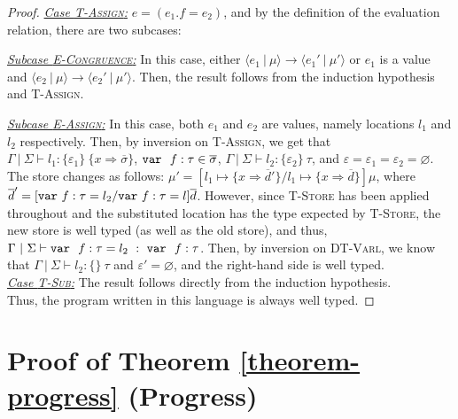 \begin{proof}
\noindent\underline{\textit{Case \textsc{T-Assign}:}}
$e = (e_1.f = e_2)$, and by the definition of the evaluation relation, there are two subcases:

\underline{\textit{Subcase \textsc{E-Congruence}:}} In this case, either $\langle e_1~|~\mu \rangle \longrightarrow \langle e_1'~|~\mu' \rangle$ or $e_1$ is a value and \mbox{$\langle e_2~|~\mu \rangle \longrightarrow \langle e_2'~|~\mu' \rangle$}. Then, the result follows from the induction hypothesis and \textsc{T-Assign}.

\underline{\textit{Subcase \textsc{E-Assign}:}} In this case, both $e_1$ and $e_2$ are values, namely locations $l_1$ and $l_2$ respectively. Then, by inversion on \textsc{T-Assign}, we get that \mbox{$\Gamma~|~\Sigma \vdash l_1 : \{ \varepsilon_1 \}~\{ x \Rightarrow \overline{\sigma} \}$}, \mbox{$\mathtt{var}~~ f : \tau \in \overline{\sigma}$}, \mbox{$\Gamma~|~\Sigma \vdash l_2 : \{ \varepsilon_2 \}~\tau$}, and \mbox{$\varepsilon = \varepsilon_1 = \varepsilon_2 = \varnothing$}. The store changes as follows:\linebreak
\mbox{$\mu' = [l_1 \mapsto \{ x \Rightarrow \overline{d}' \}/l_1 \mapsto \{ x \Rightarrow \overline{d} \}]\mu$}, where $\overline{d}' = [\mathtt{var}~ f:\tau = l_2/\mathtt{var}~ f : \tau = l]\overline{d}$. However, since \textsc{T-Store} has been applied throughout and the substituted location has the type expected by \textsc{T-Store}, the new store is well typed (as well as the old store), and thus,\linebreak
\mbox{$\Gamma~|~\Sigma \vdash \mathtt{var}~~ f : \tau = l_2~:~\mathtt{var}~~ f : \tau$}. Then, by inversion on \textsc{DT-Varl}, we know that\linebreak
\mbox{$\Gamma~|~\Sigma \vdash l_2 : \{ \}~\tau$} and $\varepsilon' = \varnothing$, and the right-hand side is well typed.
\\

\noindent\underline{\textit{Case \textsc{T-Sub}:}}
The result follows directly from the induction hypothesis.
\\

\noindent Thus, the program written in this language is always well typed.
\end{proof}



\section{Proof of Theorem \ref{theorem-progress} (Progress)}
\label{app-progress}


